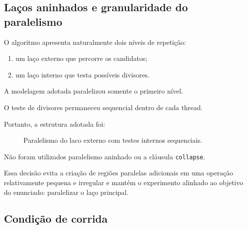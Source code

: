 \subsection{Laços aninhados e granularidade do paralelismo}

O algoritmo apresenta naturalmente dois níveis de repetição:

\begin{enumerate}
    \item um laço externo que percorre os candidatos;
    \item um laço interno que testa possíveis divisores.
\end{enumerate}

A modelagem adotada paralelizou somente o primeiro nível.

O teste de divisores permaneceu sequencial dentro de cada thread.

Portanto, a estrutura adotada foi:

\begin{figure}[htbp]
    \centering
    \caption{Paralelismo do laco externo com testes internos sequenciais.}
    \label{fig:atvd05-granularidade}
\end{figure}

Não foram utilizados paralelismo aninhado ou a cláusula
\texttt{collapse}.

Essa decisão evita a criação de regiões paralelas adicionais em uma
operação relativamente pequena e irregular e mantém o experimento alinhado
ao objetivo do enunciado: paralelizar o laço principal.


\subsection{Condição de corrida}

